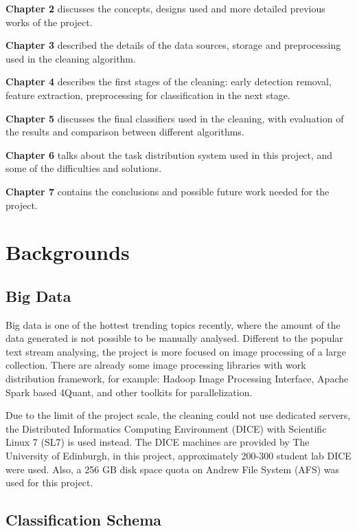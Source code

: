 \documentclass[bsc,logo,twoside,fullspacing,parskip]{infthesis}
\begin{document}
\textbf{Chapter 2} discusses the concepts, designs used and more detailed previous works of the project. 

\textbf{Chapter 3} described the details of the data sources, storage and preprocessing used in the cleaning algorithm.

\textbf{Chapter 4} describes the first stages of the cleaning: early detection removal, feature extraction, preprocessing for classification in the next stage.

\textbf{Chapter 5} discusses the final classifiers used in the cleaning, with evaluation of the results and comparison between different algorithms. 

\textbf{Chapter 6} talks about the task distribution system used in this project, and some of the difficulties and solutions.

\textbf{Chapter 7} contains the conclusions and possible future work needed for the project.
\newpage

\chapter{Backgrounds}

\section{Big Data}

Big data is one of the hottest trending topics recently, where the amount of the data generated is not possible to be manually analysed. 
Different to the popular text stream analysing, the project is more focused on image processing of a large collection. 
There are already some image processing libraries with work distribution framework, for example: Hadoop Image Processing Interface\cite{L3}, Apache Spark based 4Quant\cite{L4}, and other toolkits for parallelization.

Due to the limit of the project scale, the cleaning could not use dedicated servers, the Distributed Informatics Computing Environment (DICE) with Scientific Linux 7 (SL7) is used instead. 
The DICE machines are provided by The University of Edinburgh, in this project, approximately 200-300 student lab DICE were used.
Also, a 256 GB disk space quota on Andrew File System (AFS) was used for this project.

\section{Classification Schema}
\label{sec:schema}
\end{document}
